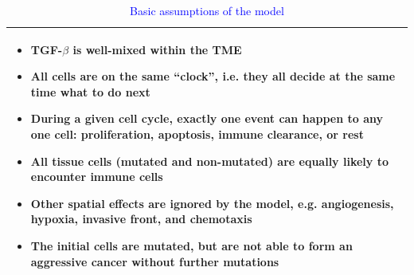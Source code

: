 \documentclass[11pt]{article}
\newcommand{\tcb} { \textcolor{blue} }
\begin{document}
\begin{table}[H]
\begin{tabular}{|p{\textwidth}|}
\hline
\begin{itemize}
\item TGF-$\beta$ is well-mixed within the TME
\item All cells are on the same ``clock'', i.e. they all decide at the same time what to do next
\item During a given cell cycle, exactly one event can happen to any one cell: proliferation, apoptosis, immune clearance, or rest
\item All tissue cells (mutated and non-mutated) are equally likely to encounter immune cells
\item Other spatial effects are ignored by the model, e.g. angiogenesis, hypoxia, invasive front, and chemotaxis
\item The initial cells are mutated, but are not able to form an aggressive cancer without further mutations
\end{itemize}
\\
\hline
\end{tabular}
\caption{\tcb{Basic assumptions of the model}}
\label{table:model_assumptions}
\end{table}
\end{document}
